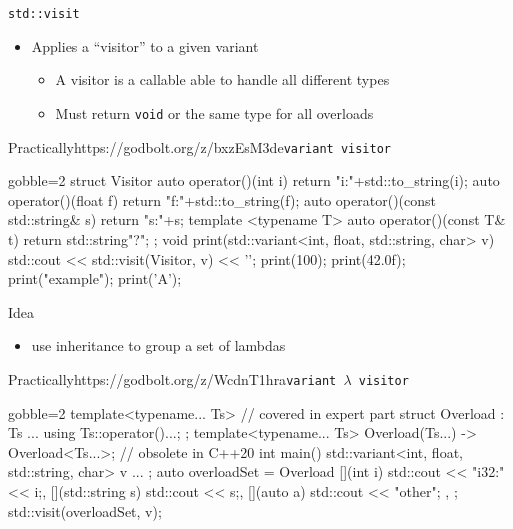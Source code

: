 \begin{frame}[fragile]
  \begin{block}{\texttt{std::visit} }
    \begin{itemize}
      \item Applies a ``visitor'' to a given variant
      \begin{itemize}
        \item A visitor is a callable able to handle all different types
        \item Must return \texttt{void} or the same type for all overloads
      \end{itemize}
    \end{itemize}
  \end{block}
  \begin{exampleblockGB}{Practically}{https://godbolt.org/z/bxzEsM3de}{\texttt{variant visitor}}
    \small
    \begin{cppcode*}{gobble=2}
      struct Visitor {
        auto operator()(int i)   {return "i:"+std::to_string(i);}
        auto operator()(float f) {return "f:"+std::to_string(f);}
        auto operator()(const std::string& s) { return "s:"+s;}
        template <typename T>
        auto operator()(const T& t) { return std::string{"?"}; }
      };
      void print(std::variant<int, float, std::string, char> v) {
        std::cout << std::visit(Visitor{}, v) << '\n';
      }
      print(100); print(42.0f); print("example"); print('A');
    \end{cppcode*}
  \end{exampleblockGB}
\end{frame}

\begin{frame}[fragile]
  \begin{block}{Idea}
    \begin{itemize}
    \item use inheritance to group a set of lambdas
    \end{itemize}
  \end{block}
  \begin{exampleblockGB}{Practically}{https://godbolt.org/z/WcdnT1hra}{\texttt{variant $\lambda$ visitor}}
    \small
    \begin{cppcode*}{gobble=2}
      template<typename... Ts> // covered in expert part
      struct Overload : Ts ... { using Ts::operator()...; };
      template<typename... Ts>
      Overload(Ts...) -> Overload<Ts...>; // obsolete in C++20
      int main(){
        std::variant<int, float, std::string, char> v{ ... };
        auto overloadSet = Overload {
          [](int i) { std::cout << "i32:" << i;},
          [](std::string s) { std::cout << s;},
          [](auto a) { std::cout << "other"; },
        };
        std::visit(overloadSet, v);
      }
    \end{cppcode*}
  \end{exampleblockGB}
\end{frame}

